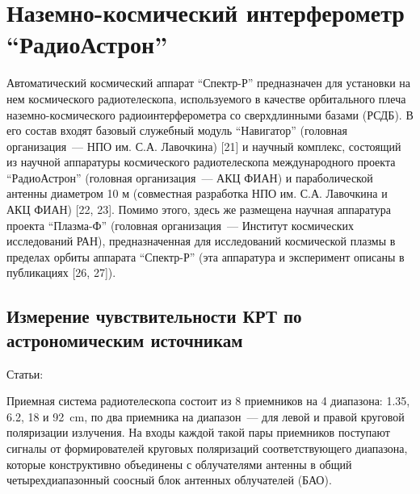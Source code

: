 \chapter{Наземно-космический интерферометр ``РадиоАстрон''} \label{chapt2}


Автоматический космический аппарат ``Спектр-Р'' предназначен для установки на нем космического
радиотелескопа, используемого в качестве орбитального плеча наземно-космического
радиоинтерферометра со сверхдлинными базами (РСДБ). В его состав входят базовый служебный модуль
``Навигатор'' (головная организация~--- НПО им. С.А. Лавочкина) [21] и научный комплекс, состоящий
из научной аппаратуры космического радиотелескопа международного проекта ``РадиоАстрон'' (головная
организация~--- АКЦ ФИАН) и параболической антенны диаметром 10 м (совместная разработка НПО им.
С.А. Лавочкина и АКЦ ФИАН) [22, 23]. Помимо этого, здесь же размещена научная аппаратура проекта
``Плазма-Ф'' (головная организация~--- Институт космических исследований РАН), предназначенная для
исследований космической плазмы в пределах орбиты аппарата ``Спектр-Р'' (эта аппаратура и
эксперимент описаны в публикациях [26, 27]).


\section{Измерение чувствительности КРТ по астрономическим источникам}

Статьи: \cite{Kardashev_2013_rus, Kovalev_2014_rus}

Приемная система радиотелескопа состоит из 8 приемников на 4 диапазона: 1.35, 6.2, 18 и
\SI{92}{\cm}, по два приемника на диапазон~--- для левой и правой круговой поляризации излучения. На
входы каждой такой пары приемников поступают сигналы от формирователей круговых поляризаций
соответствующего диапазона, которые конструктивно объединены с облучателями антенны в общий
четырехдиапазонный соосный блок антенных облучателей (БАО).

